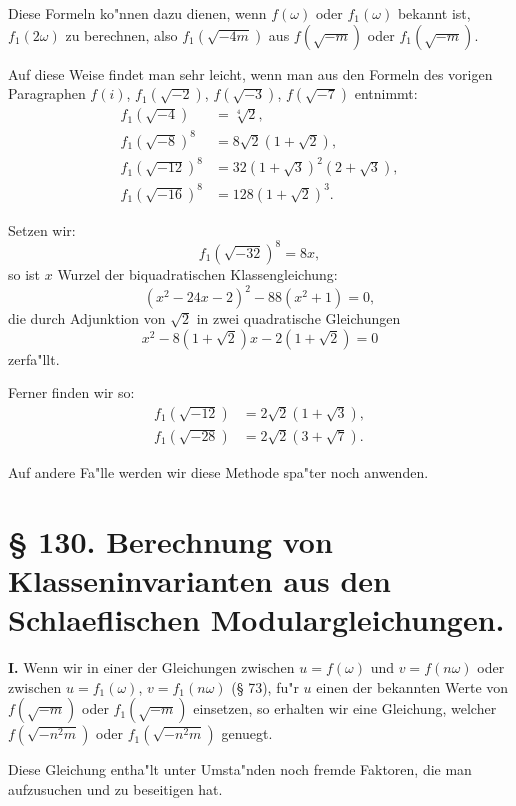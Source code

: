 \documentclass[12pt,a4paper]{article}
\theoremstyle{plain}
\theoremstyle{definition}
\theoremstyle{remark}
\begin{document}
Diese Formeln ko"nnen dazu dienen, wenn $f(\omega)$ oder $f_1(\omega)$ bekannt ist, $f_1(2\omega)$ zu berechnen, also $f_1(\sqrt{-4m})$ aus $f(\sqrt{-m})$ oder $f_1(\sqrt{-m})$.

Auf diese Weise findet man sehr leicht, wenn man aus den Formeln des vorigen Paragraphen $f(i)$, $f_1(\sqrt{-2})$, $f(\sqrt{-3})$, $f(\sqrt{-7})$ entnimmt:
\begin{align}
f_1(\sqrt{-4}) &= \sqrt[4]{2}, \label{eq:129_2}\\
f_1(\sqrt{-8})^8 &= 8\sqrt{2}(1 + \sqrt{2}), \label{eq:129_3}\\
f_1(\sqrt{-12})^8 &= 32(1 + \sqrt{3})^2(2 + \sqrt{3}), \label{eq:129_4}\\
f_1(\sqrt{-16})^8 &= 128(1 + \sqrt{2})^3. \label{eq:129_5}
\end{align}

Setzen wir:
\[
f_1(\sqrt{-32})^8 = 8x,
\]
so ist $x$ Wurzel der biquadratischen Klassengleichung:
\begin{equation}\label{eq:129_6}
(x^2 - 24x - 2)^2 - 88(x^2 + 1) = 0,
\end{equation}
die durch Adjunktion von $\sqrt{2}$ in zwei quadratische Gleichungen
\[
x^2 - 8(1 + \sqrt{2})x - 2(1 + \sqrt{2}) = 0
\]
zerfa"llt.

Ferner finden wir so:
\begin{align}
f_1(\sqrt{-12}) &= 2\sqrt{2}(1 + \sqrt{3}), \label{eq:129_7}\\
f_1(\sqrt{-28}) &= 2\sqrt{2}(3 + \sqrt{7}). \label{eq:129_8}
\end{align}

Auf andere Fa"lle werden wir diese Methode spa"ter noch anwenden.


\newpage
\section*{\S{} 130. Berechnung von Klasseninvarianten aus den Schlaeflischen Modulargleichungen.}

\textbf{I.} Wenn wir in einer der Gleichungen zwischen $u = f(\omega)$ und $v = f(n\omega)$ oder zwischen $u = f_1(\omega)$, $v = f_1(n\omega)$ (\S{} 73), fu"r $u$ einen der bekannten Werte von $f(\sqrt{-m})$ oder $f_1(\sqrt{-m})$ einsetzen, so erhalten wir eine Gleichung, welcher $f(\sqrt{-n^2 m})$ oder $f_1(\sqrt{-n^2 m})$ genuegt.

Diese Gleichung entha"lt unter Umsta"nden noch fremde Faktoren, die man aufzusuchen und zu beseitigen hat.
\end{document}

